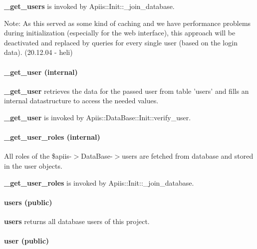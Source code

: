 \textbf{\_get\_users} is invoked by Apiis::Init::\_join\_database.



Note: As this served as some kind of caching and we have performance
problems during initialization (especially for the web interface), this
approach will be deactivated and replaced by queries for every single user
(based on the login data). (20.12.04 - heli)

\paragraph*{\_get\_user (internal)\label{Apiis::DataBase::Init_--_Basic_database_initialisation__get_user_internal_}}


\textbf{\_get\_user} retrieves the data for the passed user from table 'users' and fills
an internal datastructure to access the needed values.



\textbf{\_get\_user} is invoked by Apiis::DataBase::Init::verify\_user.

\paragraph*{\_get\_user\_roles (internal)\label{Apiis::DataBase::Init_--_Basic_database_initialisation__get_user_roles_internal_}}


All roles of the \$apiis-$>$DataBase-$>$users are fetched from database and stored
in the user objects.



\textbf{\_get\_user\_roles} is invoked by Apiis::Init::\_join\_database.

\paragraph*{users (public)\label{Apiis::DataBase::Init_--_Basic_database_initialisation_users_public_}}


\textbf{users} returns all database users of this project.

\paragraph*{user (public)\label{Apiis::DataBase::Init_--_Basic_database_initialisation_user_public_}}


